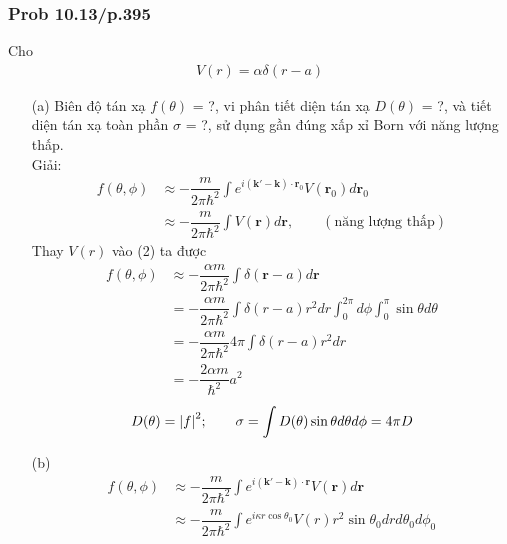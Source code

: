 \documentclass{report}
\newcommand{\f}[2]{\dfrac{#1}{#2}}
\begin{document}
\subsubsection{Prob 10.13/p.395}
Cho
\begin{align*}
	V(r) = \alpha \delta(r-a)
\end{align*}
\begin{enumerate}
	\item [(a)] Biên độ tán xạ $f(\theta)$ = ?, vi phân tiết diện tán xạ $D(\theta)$ = ?, và tiết diện tán xạ toàn phần $\sigma$ = ?, sử dụng gần đúng xấp xỉ Born với năng lượng thấp.\\
	      Giải:
	      \begin{align*}
		      f(\theta,\phi)
		       & \approx -\f{m}{2\pi \hbar^2} \int e^{i(\mathbf{k' - k})\cdot \mathbf{r}_0} V(\mathbf{r}_0) d\mathbf{r}_0 \tag{1} \\
		       & \approx -\f{m}{2\pi \hbar^2} \int V(\mathbf{r}) d\mathbf{r}, \quad \quad (\text{năng lượng thấp}) \tag{2}
	      \end{align*}
	      Thay $V(r)$ vào (2) ta được
	      \begin{align*}
		      f(\theta,\phi)
		       & \approx  -\f{\alpha m}{2\pi \hbar^2} \int \delta(\mathbf{r} - a) d\mathbf{r}                                  \\
		       & =  -\f{\alpha m}{2\pi \hbar^2} \int \delta(r - a)r^2 dr \int_{0}^{2\pi}d\phi \int_{0}^{\pi}\sin\theta d\theta \\
		       & =  -\f{\alpha m}{2\pi \hbar^2} 4\pi \int \delta(r - a)r^2 dr                                                  \\
		       & = -\f{2\alpha m}{ \hbar^2} a^2
	      \end{align*}
	      \begin{align*}
		      D(\theta) = \abs{f}^2 ; \quad \quad \sigma = \int D(\theta)\sin\theta d\theta d\phi = 4\pi D
	      \end{align*}
	\item [(b)]
	      \begin{align*}
		      f(\theta,\phi)
		       & \approx -\f{m}{2\pi \hbar^2} \int e^{i(\mathbf{k' - k})\cdot \mathbf{r}} V(\mathbf{r}) d\mathbf{r}                                                                      \\
		       & \approx -\f{m}{2\pi \hbar^2} \int e^{i\kappa r \cos\theta_{0}}V(r)r^{2}\sin\theta_{0}dr d\theta_{0} d\phi_{0}                                                           \\

\end{align*}
\end{enumerate}
\end{document}
